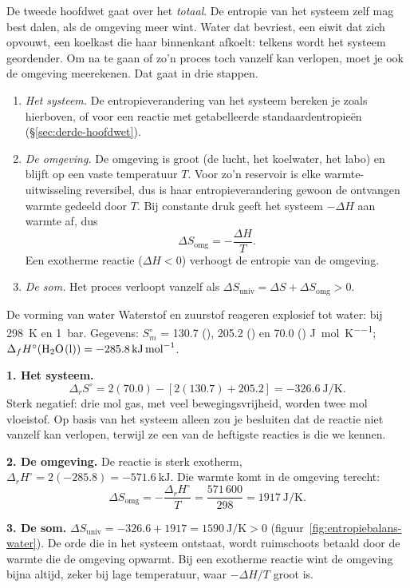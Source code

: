 De tweede hoofdwet gaat over het \emph{totaal}. De entropie van het systeem zelf mag best dalen, als de omgeving meer wint. Water dat bevriest, een eiwit dat zich opvouwt, een koelkast die haar binnenkant afkoelt: telkens wordt het systeem geordender. Om na te gaan of zo'n proces toch vanzelf kan verlopen, moet je ook de omgeving meerekenen. Dat gaat in drie stappen.
\begin{enumerate}
\item \emph{Het systeem.} De entropieverandering van het systeem bereken je zoals hierboven, of voor een reactie met getabelleerde standaardentropie\"en (\S\ref{sec:derde-hoofdwet}).
\item \emph{De omgeving.} De omgeving is groot (de lucht, het koelwater, het labo) en blijft op een vaste temperatuur $T$. Voor zo'n reservoir is elke warmte-uitwisseling reversibel, dus is haar entropieverandering gewoon de ontvangen warmte gedeeld door $T$. Bij constante druk geeft het systeem $-\Delta H$ aan warmte af, dus
\[
\Delta S_\text{omg} = -\frac{\Delta H}{T}.
\]
Een exotherme reactie ($\Delta H < 0$) verhoogt de entropie van de omgeving.
\item \emph{De som.} Het proces verloopt vanzelf als $\Delta S_\text{univ} = \Delta S + \Delta S_\text{omg} > 0$.
\end{enumerate}

\begin{voorbeeld}{De vorming van water}
Waterstof en zuurstof reageren explosief tot water:  bij \SI{298}{\kelvin} en \SI{1}{\bar}. Gegevens: $S_m^\circ$ = 130.7 (), 205.2 () en 70.0 () \si{\joule\per\mole\per\kelvin}; $\Delta_fH^\circ(\ce{H2O(l)}) = \SI{-285.8}{\kilo\joule\per\mole}$.

\textbf{1. Het systeem.} 
\[
\Delta_r S^\circ = 2(70.0) - [2(130.7) + 205.2] = \SI{-326.6}{\joule\per\kelvin}.
\]
Sterk negatief: drie mol gas, met veel bewegingsvrijheid, worden twee mol vloeistof. Op basis van het systeem alleen zou je besluiten dat de reactie niet vanzelf kan verlopen, terwijl ze een van de heftigste reacties is die we kennen.

\textbf{2. De omgeving.} De reactie is sterk exotherm, $\Delta_r H^\circ = 2(-285.8) = \SI{-571.6}{\kilo\joule}$. Die warmte komt in de omgeving terecht:
\[
\Delta S_\text{omg} = -\frac{\Delta_r H^\circ}{T} = \frac{571\,600}{298} = \SI{+1917}{\joule\per\kelvin}.
\]

\textbf{3. De som.} $\Delta S_\text{univ} = -326.6 + 1917 = \SI{+1590}{\joule\per\kelvin} > 0$ (figuur~\ref{fig:entropiebalans-water}). De orde die in het systeem ontstaat, wordt ruimschoots betaald door de warmte die de omgeving opwarmt. Bij een exotherme reactie wint de omgeving bijna altijd, zeker bij lage temperatuur, waar $-\Delta H/T$ groot is.
\end{voorbeeld}

